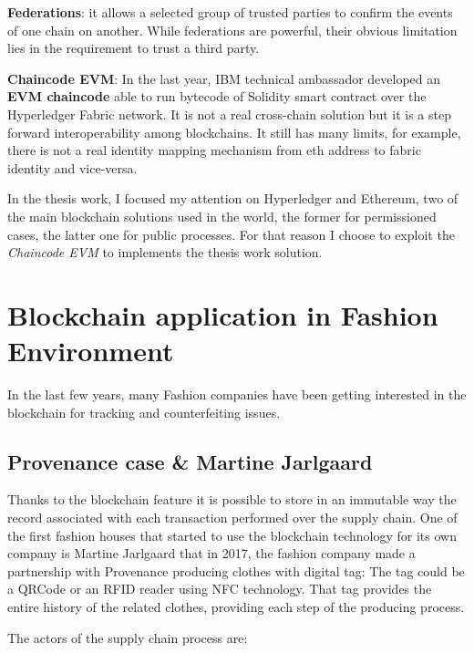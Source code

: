 \begin{outline}
    \1 \textbf{Federations}: it allows a selected group of trusted parties to confirm the events of one chain on 
    another. While federations are powerful, their obvious limitation lies in the requirement to trust a 
    third party.

    \1 \textbf{Chaincode EVM}: In the last year, IBM technical ambassador developed an \textbf{EVM chaincode}\cite{evm-chaincode} 
    able to run bytecode of Solidity smart contract over the Hyperledger Fabric network. It is not a real 
    cross-chain solution but it is a step forward interoperability among blockchains. It still has many limits, 
    for example, there is not a real identity mapping mechanism from eth address to fabric identity and vice-versa.

\end{outline}

In the thesis work, I focused my attention on Hyperledger and Ethereum, two of the main blockchain 
solutions used in the world, the former for permissioned cases, the latter one for public processes. For that reason 
I choose to exploit the \textit{Chaincode EVM} to implements the thesis work solution. 
 

\section{Blockchain application in Fashion Environment}

In the last few years, many Fashion companies have been getting interested in the blockchain for tracking and 
counterfeiting issues.

\subsection{Provenance case & Martine Jarlgaard}

Thanks to the blockchain feature it is possible to store in an immutable way the record associated with each 
transaction performed over the supply chain.  One of the first fashion houses that started to use the blockchain 
technology for its own company is Martine Jarlgaard that in 2017, the fashion company made a partnership with Provenance\cite{provenance} 
producing clothes with digital tag: The tag could be a QRCode or an RFID reader using NFC technology.
That tag provides the entire history of the related clothes, providing each step of the producing process.
\bigskip

The actors of the supply chain process are:

